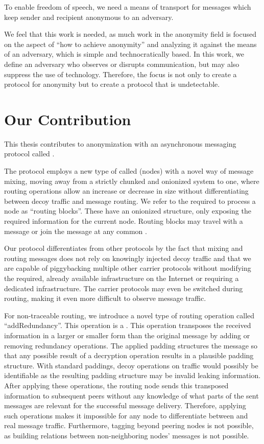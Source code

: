 To enable freedom of speech, we need a means of transport for messages which keep sender and recipient anonymous to an adversary.

We feel that this work is needed, as much work in the anonymity field is focused on the aspect of ``how to achieve anonymity'' and analyzing it against the means of an adversary, which is simple and technocratically based. In this work, we define an adversary who observes or disrupts communication, but may also suppress the use of technology. Therefore, the focus is not only to create a protocol for anonymity but to create a protocol that is undetectable.

\chapter{Our Contribution}
This thesis contributes to anonymization with an asynchronous messaging protocol called \MessageVortex.

The protocol employs a new type of  called \VortexNodes{} (nodes) with a novel way of message mixing, moving away from a strictly chunked and onionized system to one, where routing operations allow an increase or decrease in size without differentiating between decoy traffic and message routing. We refer to the  required to process a node as ``routing blocks''. These  have an onionized structure, only exposing the required information for the current node. Routing blocks may travel with a message or join the message at any common \VortexNode.

Our protocol differentiates from other protocols by the fact that mixing and routing messages does not rely on knowingly injected decoy traffic and that we are capable of piggybacking multiple other carrier protocols without modifying the required, already available infrastructure on the Internet or requiring a dedicated infrastructure. The carrier protocols may even be switched during routing, making it even more difficult to observe message traffic. 

For non-traceable routing, we introduce a novel type of routing operation called ``add\-Redundancy''. This operation is a  . This operation transposes the received information in a larger or smaller form than the original message by adding or removing redundancy operations. The applied padding structures the message so that any possible result of a decryption operation results in a plausible padding structure. With standard paddings, decoy operations on traffic would possibly be identifiable as the resulting padding structure may be invalid leaking information. After applying these operations, the routing node sends this transposed information to subsequent peers without any knowledge of what parts of the sent messages are relevant for the successful message delivery. Therefore, applying such operations makes it impossible for any node to differentiate between  and real message traffic. Furthermore, tagging beyond peering nodes is not possible, as building relations between non-neighboring nodes' messages is not possible.


